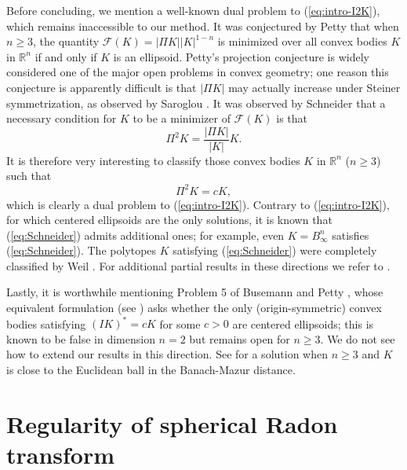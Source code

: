 \documentclass[11pt]{article}
\theoremstyle{definition}
\theoremstyle{proof}
\DeclareMathOperator{\+}{\mathop{\tilde{+}}}
\newcommand{\R}{\mathbb{R}}
\newcommand{\F}{\mathcal{F}}
\numberwithin{equation}{section}
\numberwithin{equation}{section}
\begin{document}
Before concluding, we mention a well-known dual problem to (\ref{eq:intro-I2K}), which remains inaccessible to our method. It was conjectured by Petty \cite{Petty-IsoperimetricProblems} that when $n \geq 3$, the quantity $\F(K) = |\Pi K| |K|^{1-n}$ is minimized over all convex bodies $K$ in $\R^n$ if and only if $K$ is an ellipsoid. Petty's projection conjecture is widely considered one of the major open problems in convex geometry; one reason this conjecture is apparently difficult is that $|\Pi K|$ may actually increase under Steiner symmetrization, as observed by Saroglou \cite{Saroglou-PettyNotMonotoneUnderSteiner}. It was observed by Schneider \cite[pp. 570-571]{Schneider-Book-2ndEd} 
that a necessary condition for $K$ to be a minimizer of $\F(K)$ is that
\[
\Pi^2 K = \frac{|\Pi K|}{|K|} K . 
\]
It is therefore very interesting to classify those convex bodies $K$ in $\R^n$ ($n \geq 3$) such that
\begin{equation} \label{eq:Schneider}
\Pi^2 K = c K ,
\end{equation}
which is clearly a dual problem to (\ref{eq:intro-I2K}). Contrary to (\ref{eq:intro-I2K}), for which centered ellipsoids are the only solutions, it is known that (\ref{eq:Schneider}) admits additional ones;
for example, even $K=B_\infty^n$ satisfies (\ref{eq:Schneider}).
The polytopes $K$ satisfying (\ref{eq:Schneider}) were completely classified by Weil \cite{Weil-Pi2KForPolytopes}. For additional partial results in these directions we refer to \cite{Ivaki-SecondMixedProjection,Ivaki-LocalUniquenessForPetty,SaroglouZvavitch-IterationsOfPi}. 

\medskip

Lastly, it is worthwhile mentioning Problem 5 of Busemann and Petty \cite{Busemann-Petty}, whose equivalent formulation (see \cite[Open Problem 12.6]{Lutwak-Selected}) asks whether the only (origin-symmetric) convex bodies satisfying $(I K)^* = c K$ for some $c>0$ are centered ellipsoids; this is known to be false in dimension $n=2$ but remains open for $n \geq 3$. We do not see how to extend our results in this direction. See \cite{ANRY-BusemannProblems5and8} for a solution when $n\geq 3$ and $K$ is close to the Euclidean ball in the Banach-Mazur distance. 


\appendix

\section{Regularity of spherical Radon transform} \label{sec:appendix}
\end{document}
